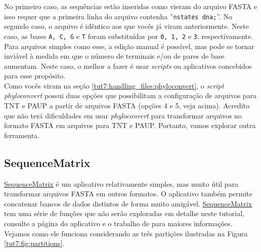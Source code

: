 \begin{refsection}
\normalsize

No primeiro caso, as sequências estão inseridas como vieram do arquivo FASTA e isso requer que a primeira linha do arquivo contenha ''\texttt{nstates dna;}''. No segundo caso, o arquivo é idêntico aos que vocês já viram anteriormente. Neste caso, as bases \texttt{A, C, G} e \texttt{T} foram substituídas por \texttt{0, 1, 2} e \texttt{3}, respectivamente. Para arquivos simples como esse, a edição manual é possível, mas pode se tornar inviável à medida em que o número de terminais e/ou de pares de base aumentam. Neste caso, o melhor a fazer é usar \textit{scripts} ou aplicativos concebidos para esse propósito.\\

Como vocês viram na seção \ref{tut7:handling_files:phyloconvert}, o \textit{script} \textit{phyloconvert} possui duas opções que possibilitam a configuração de arquivos para TNT e PAUP a partir de arquivos FASTA (opções 4 e 5, veja acima). Acredito que não terá dificuldades em usar \textit{phyloconvert} para transformar arquivos no formato FASTA em arquivos para TNT e PAUP. Portanto, vamos explorar outra ferramenta.\\

	\subsection{SequenceMatrix}\label{tut7:matrices:sequencematrix}

    \href{https://code.google.com/p/sequencematrix/}{SequenceMatrix}
	\parencite{Vaidya_et_all_2010} é um aplicativo relativamente simples, mas muito útil para transformar arquivos FASTA em outros formatos. O aplicativo também permite concatenar bancos de dados distintos de forma muito amigável. \href{https://code.google.com/p/sequencematrix/}{SequenceMatrix} tem uma série de funções que não serão exploradas em detalhe neste tutorial, consulte a página do aplicativo e o trabalho de \textcite{Vaidya_et_all_2010} para maiores informações. Vejamos como ele funciona considerando as três partições ilustradas na Figura \ref{tut7:fig:partitions}.


\end{refsection}
